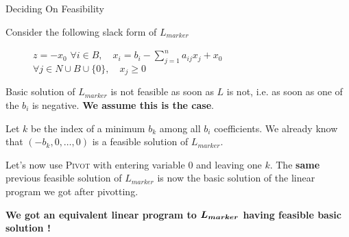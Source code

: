 \documentclass[32pt, aspectratio = 169]{beamer}
\begin{document}
\begin{frame}{Deciding On Feasibility}
    \setlength\columnseprule{.1pt}
    \begin{multicols}{2}
        Consider the following slack form of $L_{marker}$
        \begin{figure}
            \begin{linearProgG}{
                ${\displaystyle z = -x_0}$
                }{
                ${\displaystyle \forall i \in B, \quad x_i = b_i - \sum_{j=1}^n a_{ij}x_j + x_0}$
                }{
                $\forall j \in N\cup B \cup\{0 \}, \quad x_j \geq 0$
                }
            \end{linearProgG}
        \end{figure}
        Basic solution of $L_{marker}$ is not feasible as soon as $L$ is not, i.e. as soon as one of the $b_i$ is negative. \alert{\textbf{We assume this is the case}}.

        Let $k$ be the index of a minimum $b_k$ among all $b_i$ coefficients. We already know that $(-b_k, 0, \ldots, 0)$ is a feasible solution of $L_{marker}$.

        Let's now use \textsc{Pivot} with entering variable $0$ and leaving one $k$. The \alert{\textbf{same}} previous feasible solution of $L_{marker}$ is now the basic solution of the linear program we got after pivotting.
        \vspace{.5\baselineskip}

        \textbf{We got an equivalent linear program to $\boldsymbol{L_{marker}}$ having feasible basic solution !}
    \end{multicols}
\end{frame}
\end{document}
